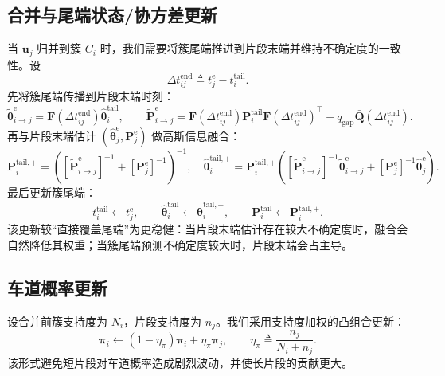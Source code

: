 \documentclass{xdupgthesis}
\begin{document}
\subsection{合并与尾端状态/协方差更新}
当 $\mathbf{u}_j$ 归并到簇 $C_i$ 时，我们需要将簇尾端推进到片段末端并维持不确定度的一致性。设
\[
\Delta t_{ij}^{\mathrm{end}}\triangleq t_j^{\mathrm{e}}-t_i^{\mathrm{tail}}.
\]
先将簇尾端传播到片段末端时刻：
\begin{equation}
	\tilde{\boldsymbol{\theta}}_{i\rightarrow j}^{\mathrm{e}}
	=
	\mathbf{F}(\Delta t_{ij}^{\mathrm{end}})\hat{\boldsymbol{\theta}}_i^{\mathrm{tail}},
	\qquad
	\tilde{\mathbf{P}}_{i\rightarrow j}^{\mathrm{e}}
	=
	\mathbf{F}(\Delta t_{ij}^{\mathrm{end}})\mathbf{P}_i^{\mathrm{tail}}\mathbf{F}(\Delta t_{ij}^{\mathrm{end}})^\top
	+
	q_{\mathrm{gap}}\bar{\mathbf{Q}}(\Delta t_{ij}^{\mathrm{end}}).
	\tag{4-26}
\end{equation}
再与片段末端估计 $(\hat{\boldsymbol{\theta}}_j^{\mathrm{e}},\mathbf{P}_j^{\mathrm{e}})$ 做高斯信息融合：
\begin{equation}
	\mathbf{P}_i^{\mathrm{tail},+}
	=
	\left(
	[\tilde{\mathbf{P}}_{i\rightarrow j}^{\mathrm{e}}]^{-1}
	+
	[\mathbf{P}_j^{\mathrm{e}}]^{-1}
	\right)^{-1},
	\quad
	\hat{\boldsymbol{\theta}}_i^{\mathrm{tail},+}
	=
	\mathbf{P}_i^{\mathrm{tail},+}
	\left(
	[\tilde{\mathbf{P}}_{i\rightarrow j}^{\mathrm{e}}]^{-1}\tilde{\boldsymbol{\theta}}_{i\rightarrow j}^{\mathrm{e}}
	+
	[\mathbf{P}_j^{\mathrm{e}}]^{-1}\hat{\boldsymbol{\theta}}_j^{\mathrm{e}}
	\right).
	\tag{4-27}
\end{equation}
最后更新簇尾端：
\begin{equation}
	t_i^{\mathrm{tail}}\leftarrow t_j^{\mathrm{e}},\qquad
	\hat{\boldsymbol{\theta}}_i^{\mathrm{tail}}\leftarrow \hat{\boldsymbol{\theta}}_i^{\mathrm{tail},+},\qquad
	\mathbf{P}_i^{\mathrm{tail}}\leftarrow \mathbf{P}_i^{\mathrm{tail},+}.
	\tag{4-28}
\end{equation}
该更新较“直接覆盖尾端”为更稳健：当片段末端估计存在较大不确定度时，融合会自然降低其权重；当簇尾端预测不确定度较大时，片段末端会占主导。%

\subsection{车道概率更新}
设合并前簇支持度为 $N_i$，片段支持度为 $n_j$。我们采用支持度加权的凸组合更新：
\begin{equation}
	\boldsymbol{\pi}_i
	\leftarrow
	(1-\eta_{\pi})\boldsymbol{\pi}_i+\eta_{\pi}\boldsymbol{\pi}_j,
	\qquad
	\eta_{\pi}\triangleq \frac{n_j}{N_i+n_j}.
	\tag{4-29}
\end{equation}
该形式避免短片段对车道概率造成剧烈波动，并使长片段的贡献更大。
\end{document}
